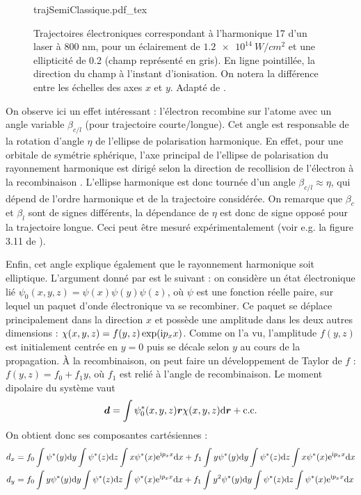 \begin{figure}[!ht]
\centering
\def\svgwidth{0.7\columnwidth}
{trajSemiClassique.pdf_tex}
\caption{Trajectoires électroniques correspondant à l’harmonique 17 d'un laser à 800 nm, pour un éclairement de $\SI{1.2e14}{W/cm^2}$ et une ellipticité de 0.2 (champ représenté en gris).
En ligne pointillée, la direction du champ à l’instant d’ionisation. On notera la différence entre les échelles
des axes $x$ et $y$. Adapté de .}
\label{fig:ellhiguet}
\end{figure}

On observe ici un effet intéressant : l'électron recombine sur l'atome avec un angle variable $\beta_{c/l}$ (pour trajectoire courte/longue). Cet angle est responsable de la rotation d'angle $\eta$ de l'ellipse de polarisation harmonique. En effet, pour une orbitale de symétrie sphérique, l'axe principal de l'ellipse de polarisation du rayonnement harmonique est dirigé selon la direction de recollision de l'électron à la recombinaison . L'ellipse harmonique est donc tournée d'un angle $\beta_{c/l}\approx\eta$, qui dépend de l'ordre harmonique et de la trajectoire considérée. On remarque que $\beta_c$ et $\beta_l$ sont de signes différents, la dépendance de $\eta$ est donc de signe opposé pour la trajectoire longue. Ceci peut être mesuré expérimentalement (voir e.g. la figure 3.11 de ).\par
Enfin, cet angle explique également que le rayonnement harmonique soit elliptique. L'argument donné par  est le suivant : on considère un état électronique lié $\psi_0(x,y,z) = \psi(x)\psi(y)\psi(z)$, où $\psi$ est une fonction réelle paire, sur lequel un paquet d'onde électronique va se recombiner. Ce paquet se déplace principalement dans la direction $x$ et possède une amplitude dans les deux autres dimensions : $\chi(x,y,z) = f(y,z)\exp(\mathrm{i} p_x x)$. Comme on l'a vu, l'amplitude $f(y,z)$ est initialement centrée en $y=0$ puis se décale selon $y$ au cours de la propagation. \`{A} la recombinaison, on peut faire un développement de Taylor de $f$ : $f(y,z) = f_0 + f_1 y$, où $f_1$ est relié à l'angle de recombinaison. Le moment dipolaire du système vaut 
\begin{equation}
\bm{d} = \int{\psi_0^*(x,y,z) \bm{r} \chi(x,y,z) \mathrm{d}\bm{r}} + \text{c.c.}
\end{equation}
On obtient donc ses composantes cartésiennes :
\begin{align}
d_x &= f_0\int{\psi^*(y)\mathrm{d}y}\int{\psi^*(z)\mathrm{d}z}\int{x\psi^*(x)\mathrm{e}^{\mathrm{i}p_x x}\mathrm{d}x} + 
f_1\int{y \psi^*(y)\mathrm{d}y}\int{\psi^*(z)\mathrm{d}z}\int{x\psi^*(x)\mathrm{e}^{\mathrm{i}p_x x}\mathrm{d}x}\nonumber\\
d_y &= f_0\int{y \psi^*(y)\mathrm{d}y}\int{\psi^*(z)\mathrm{d}z}\int{\psi^*(x)\mathrm{e}^{\mathrm{i}p_x x}\mathrm{d}x} + 
f_1\int{y^2 \psi^*(y)\mathrm{d}y}\int{\psi^*(z)\mathrm{d}z}\int{\psi^*(x)\mathrm{e}^{\mathrm{i}p_x x}\mathrm{d}x}
\end{align}
